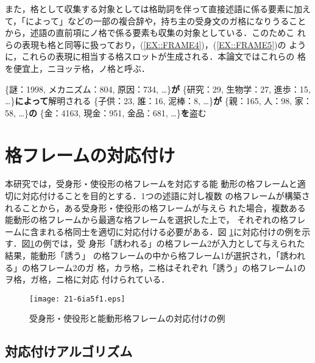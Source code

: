 \documentclass[japanese]{jnlp_1.4}
\begin{document}
 また，格として収集する対象としては格助詞を伴って直接述語に係る要素に加え
 て，「によって」などの一部の複合辞や，持ち主の受身文のガ格になりうること
 から，述語の直前項にノ格で係る要素も収集の対象としている．このためこ
 れらの表現も格と同等に扱っており，(\ref{EX::FRAME4})，(\ref{EX::FRAME5})の
 ように，これらの表現に相当する格スロットが生成される．本論文ではこれらの
 格を便宜上，ニヨッテ格，ノ格と呼ぶ．
 
\begin{exe}
\label{EX::FRAME4}
 \sn \{謎：1998, メカニズム：804, 原因：734, …\}\textbf{が}
 \sn \{研究：29, 生物学：27, 進歩：15, …\}\textbf{によって}解明される
\pagebreak
	\label{EX::FRAME5}
 \sn \{子供：23, 誰：16, 泥棒：8, …\}\textbf{が}
 \sn \{親：165, 人：98, 家：58, …\}\textbf{の}
 \sn \{金：4163, 現金：951, 金品：681, …\}\textbf{を}盗む
\end{exe}


 \section{格フレームの対応付け}
 \label{SEC::PROPOSED} 

本研究では，受身形・使役形の格フレームを対応する能
 動形の格フレームと適切に対応付けることを目的とする．1つの述語に対し複数
 の格フレームが構築されることから，ある受身形・使役形の格フレームが与えら
 れた場合，複数ある能動形の格フレームから最適な格フレームを選択した上で，
 それぞれの格フレームに含まれる格同士を適切に対応付ける必要がある．図
 \ref{FIG::TaskDef}に対応付けの例を示す．図\ref{FIG::TaskDef}の例では，受
 身形「誘われる」の格フレーム2が入力として与えられた結果，能動形「誘う」
 の格フレームの中から格フレーム1が選択され，「誘われる」の格フレーム2のガ
 格，カラ格，ニ格はそれぞれ「誘う」の格フレーム1のヲ格，ガ格，ニ格に対応
 付けられている．

  \begin{figure}[b]
   \begin{center}
    \texttt{[image: 21-6ia5f1.eps]}
    \caption{受身形・使役形と能動形格フレームの対応付けの例}
    \label{FIG::TaskDef}
   \end{center}
  \end{figure}


  \subsection{対応付けアルゴリズム}
\end{document}
